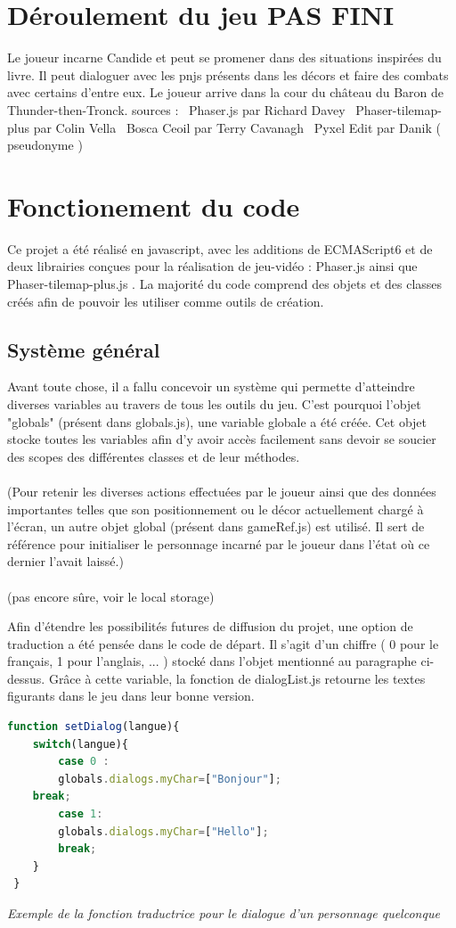 \documentclass[11pt]{article}
\begin{document}
\section{Déroulement du jeu PAS FINI}
Le joueur incarne Candide et peut se promener dans des situations inspirées du livre. Il peut dialoguer avec les pnjs présents dans les décors et faire des combats avec certains d'entre eux. Le joueur arrive dans la cour du château du Baron de Thunder-then-Tronck. 
sources : \
Phaser.js par Richard Davey \
Phaser-tilemap-plus par Colin Vella \
Bosca Ceoil par Terry Cavanagh \
Pyxel Edit par Danik ( pseudonyme )\


\section{Fonctionement du code}
Ce projet a été réalisé en javascript, avec les additions de ECMAScript6 et de deux librairies conçues pour la réalisation de jeu-vidéo : Phaser.js ainsi que Phaser-tilemap-plus.js . La majorité du code comprend des objets et des classes créés afin de pouvoir les utiliser comme outils de création.
\subsection{Système général}
	Avant toute chose, il a fallu concevoir un système qui permette d'atteindre diverses variables au travers de tous les outils du jeu. C'est pourquoi l'objet "globals" (présent dans globals.js), une variable globale a été créée. Cet objet stocke toutes les variables afin d'y avoir accès facilement sans devoir se soucier des scopes des différentes classes et de leur méthodes.\\\\
	(Pour retenir les diverses actions effectuées par le joueur ainsi que des données importantes telles que son positionnement ou le décor actuellement chargé à l'écran, un autre objet global (présent dans gameRef.js) est utilisé. Il sert de référence pour initialiser le personnage incarné par le joueur dans l'état où ce dernier l'avait laissé.)\\\\ (pas encore sûre, voir le local storage)
 
 Afin d'étendre les possibilités futures de diffusion du projet, une option de traduction a été pensée dans le code de départ. Il s'agit d'un chiffre ( 0 pour le français, 1 pour l'anglais, ... ) stocké dans l'objet mentionné au paragraphe ci-dessus. Grâce à cette variable, la fonction de dialogList.js retourne les textes figurants dans le jeu dans leur bonne version. \\
 \begin{lstlisting}[language=JavaScript]
 function setDialog(langue){
    switch(langue){
        case 0 : 
        globals.dialogs.myChar=["Bonjour"];
    break;
        case 1:
        globals.dialogs.myChar=["Hello"];
		break;
 	}
 }
\end{lstlisting}
\textit{Exemple de la fonction traductrice pour le dialogue d'un personnage quelconque}
\end{document}
